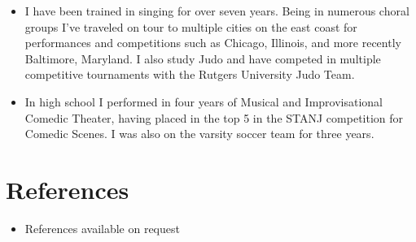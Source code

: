 \documentclass[12pt,a4paper,sans]{moderncv} %
\begin{document}
\vspace{6pt}

\begin{itemize}


\item{I have been trained in singing for over seven years. Being in numerous choral groups I've traveled on tour to multiple cities on the east coast for performances and competitions such as Chicago, Illinois, and more recently Baltimore, Maryland. I also study Judo and have competed in multiple competitive tournaments with the Rutgers University Judo Team.} 

\item{In high school I performed in four years of Musical and Improvisational Comedic Theater, having placed in the top 5 in the STANJ competition for Comedic Scenes. I was also on the varsity soccer team for three years.}

\end{itemize}

\section{References}

\vspace{6pt}
\begin{itemize}
\item{References available on request}
\end{itemize}
\vspace{1pt}

\nocite{*}

         
\end{document}
